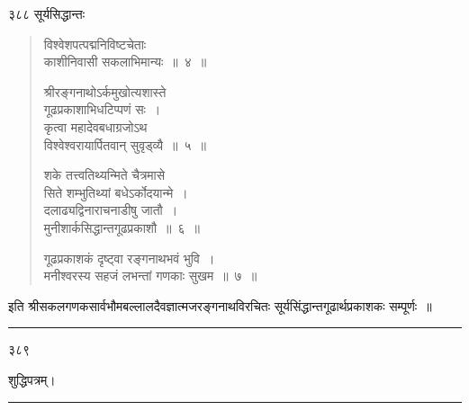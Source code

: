 \documentclass[11pt, openany]{book}
\begin{document}
\newpage


\noindent ३८८ \hspace{4cm} सूर्यसिद्धान्तः
\vspace{1cm}


\begin{quote}
{\qt विश्वेशपत्पद्मनिविष्टचेताः\\
काशीनिवासी सकलाभिमान्यः~॥~४~॥

श्रीरङ्गनाथोऽर्कमुखोत्यशास्ते\\
गूढप्रकाशाभिधटिप्पणं सः~।\\
कृत्वा महादेवबधाग्रजोऽथ\\
विश्वेश्वरायार्पितवान् सुवृड्व्यै~॥~५~॥

शके तत्त्वतिथ्यन्मिते चैत्रमासे\\
सिते शम्भुतिथ्यां बधेऽर्कोदयान्मे~।\\
दलाढ्यद्विनाराचनाडीषु जातौ~।\\
मुनीशार्कसिद्धान्तगूढप्रकाशौ~॥~६~॥

गूढप्रकाशकं दृष्ट्वा रङ्गनाथभवं भुवि~।\\
 मनीश्वरस्य सहजं लभन्तां गणकाः सुखम~॥~७~॥}
 \end{quote}

 इति श्रीसकलगणकसार्वभौमबल्लालदैवज्ञात्मजरङ्गनाथविरचितः सूर्यसिंद्धान्तगूढार्थप्रकाशकः सम्पूर्णः~॥

\begin{center}
    \rule{8em}{.5pt}
\end{center}



\newpage





\hfill ३८९ 
\vspace{2cm}

\begin{center}
{\huge{ शुद्धिपत्रम्। }}
\vspace{1cm}

\rule{7em}{.5pt}
\end{center}
\end{document}
